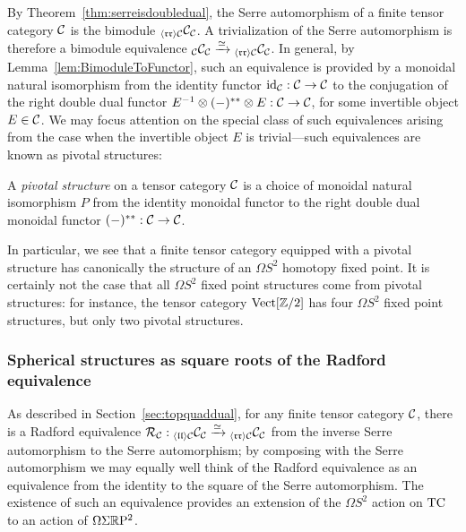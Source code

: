\documentclass{amsart}
\begin{document}

By Theorem~\ref{thm:serreisdoubledual}, the Serre automorphism of a finite tensor category $\mathcal C$ is the bimodule ${}_{\langle \mathfrak{r r} \rangle \mathcal C} \mathcal C_\mathcal C$.  A trivialization of the Serre automorphism is therefore a bimodule equivalence ${}_\mathcal C \mathcal C_\mathcal C \xrightarrow{\simeq} {}_{\langle \mathfrak{r r} \rangle \mathcal C} \mathcal C_\mathcal C$.  In general, by Lemma~\ref{lem:BimoduleToFunctor}, such an equivalence is provided by a monoidal natural isomorphism from the identity functor $\mathrm{id}_\mathcal C : \mathcal C \rightarrow \mathcal C$ to the conjugation of the right double dual functor $E^{-1} \otimes (-)^{**} \otimes E: \mathcal C \rightarrow \mathcal C$, for some invertible object $E \in \mathcal C$.  We may focus attention on the special class of such equivalences arising from the case when the invertible object $E$ is trivial---such equivalences are known as pivotal structures:
\begin{definition}
A \emph{pivotal structure} on a tensor category $\mathcal C$ is a choice of monoidal natural isomorphism $P$ from the identity monoidal functor to the right double dual monoidal functor $(-)^{**}: \mathcal C \rightarrow \mathcal C$.
\end{definition}
\nid In particular, we see that a finite tensor category equipped with a pivotal structure has canonically the structure of an $\Omega S^2$ homotopy fixed point.  It is certainly not the case that all $\Omega S^2$ fixed point structures come from pivotal structures: for instance, the tensor category $\mathrm{Vect}[\mathbb Z/2]$ has four $\Omega S^2$ fixed point structures, but only two pivotal structures.

\subsubsection{Spherical structures as square roots of the Radford equivalence}


As described in Section~\ref{sec:topquaddual}, for any finite tensor category $\mathcal C$, there is a Radford equivalence $\mathcal R_\mathcal C : {}_{\langle \mathfrak{l l} \rangle \mathcal C} \mathcal C_\mathcal C \xrightarrow{\simeq} {}_{\langle \mathfrak{r r} \rangle \mathcal C} \mathcal C_\mathcal C$ from the inverse Serre automorphism to the Serre automorphism; by composing with the Serre automorphism we may equally well think of the Radford equivalence as an equivalence from the identity to the square of the Serre automorphism.  The existence of such an equivalence provides an extension of the $\Omega S^2$ action on $\mathrm{TC}$ to an action of $\Omega \Sigma \mathbb R \mathrm{P}^2$.  
\end{document}
